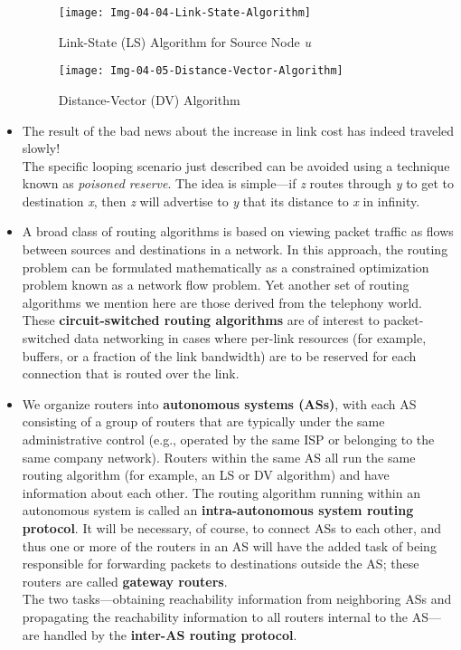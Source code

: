 \begin{itemize}
\begin{figure}[h]
\texttt{[image: Img-04-04-Link-State-Algorithm]}
\centering
\caption{Link-State (LS) Algorithm for Source Node \textit{u}}
\label{fig:fig-04-04}
\end{figure}

\begin{figure}[h]
\texttt{[image: Img-04-05-Distance-Vector-Algorithm]}
\centering
\caption{Distance-Vector (DV) Algorithm}
\label{fig:fig-04-05}
\end{figure}

\item
The result of the bad news about the increase in link cost has indeed traveled slowly!\\
The specific looping scenario just described can be avoided using a technique known as \textit{poisoned reserve}. The idea is simple---if \textit{z} routes through \textit{y} to get to destination \textit{x}, then \textit{z} will advertise to \textit{y} that its distance to \textit{x} in infinity.

\item
A broad class of routing algorithms is based on viewing packet traffic as flows between sources and destinations in a network. In this approach, the routing problem can be formulated mathematically as a constrained optimization problem known as a network flow problem. Yet another set of routing algorithms we mention here are those derived from the telephony world. These \textbf{circuit-switched routing algorithms} are of interest to packet-switched data networking in cases where per-link resources (for example, buffers, or a fraction of the link bandwidth) are to be reserved for each connection that is routed over the link.

\item
We organize routers into \textbf{autonomous systems (ASs)}, with each AS consisting of a group of routers that are typically under the same administrative control (e.g., operated by the same ISP or belonging to the same company network). Routers within the same AS all run the same routing algorithm (for example, an LS or DV algorithm) and have information about each other. The routing algorithm running within an autonomous system is called an \textbf{intra-autonomous system routing protocol}. It will be necessary, of course, to connect ASs to each other, and thus one or more of the routers in an AS will have the added task of being responsible for forwarding packets to destinations outside the AS; these routers are called \textbf{gateway routers}.\\
The two tasks---obtaining reachability information from neighboring ASs and propagating the reachability information to all routers internal to the AS---are handled by the \textbf{inter-AS routing protocol}.


\end{itemize}
